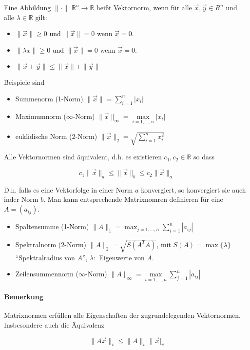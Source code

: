 \documentclass[a4paper,ngerman]{scrbook}
\newcommand{\R}{\ensuremath{\mathbb{R}}}%
\begin{document}
Eine Abbildung  $\| \cdot \|$ $\R^n \to \R$ heißt \underline{Vektornorm}, wenn für alle $\vec{x}, \vec{y} \in R^n$ und alle $\lambda \in \R$ gilt:
\begin{itemize}
\item $\|\vec{x}\| \geq 0$ und $\|\vec{x}\| = 0$ wenn $\vec{x} = 0$.
\item $\|\lambda x\| \geq 0$ und $\|\vec{x}\| = 0$ wenn $\vec{x} = 0$.
\item $\|\vec{x} + \vec{y}\| \leq \|\vec{x}\| + \|\vec{y}\|$
\end{itemize}

Beispiele sind

\begin{itemize}
\item Summenorm (1-Norm) $\|\vec{x}\| = \sum_{i=1}^n |x_i|$
  \item Maximumnorm ($\infty$-Norm) $\|\vec{x}\|_{\infty} = \max\limits_{i=1,\dots,n} |x_i|$
\item euklidische Norm (2-Norm) $\|\vec{x}\|_2 = \sqrt{\sum_{i=1}^n x_i^2}$
\end{itemize}

Alle Vektornormen sind äquivalent, d.h\@. es existieren $c_1,c_2 \in \R$ so dass

\[
c_1\|\vec{x}\|_a \leq \|\vec{x}\|_b \leq c_2 \|\vec{x}\|_a
\]

D.h\@. falls es eine Vektorfolge in einer Norm $a$ konvergiert, so konvergiert sie auch inder Norm $b$. Man kann entsprechende Matrixnomren definieren für eine $A = (a_{ij})$.
\begin{itemize}
\item Spaltensumme (1-Norm) $\|A\|_1 = \max_{j=1,\dots,n} \sum_{i=1}^n |a_{ij}|$
\item Spektralnorm (2-Norm) $\|A\|_2 = \sqrt{S(A^TA)}$, mit $S(A) = \max\{\lambda\}$ "`Spektralradius von $A$"', $\lambda\colon$ Eigenwerte von $A$.
\item Zeilensummennorm ($\infty$-Norm) $\|A\|_\infty = \max\limits_{i=1,\dots,n} \displaystyle\sum_{j=1}^n |a_{ij}|$
\end{itemize}

\paragraph{Bemerkung}

Matrixnormen erfüllen alle Eigenschaften der zugrundelegenden Vektornormen. Insbesondere auch die Äquivalenz

\[
\|A\vec{x}\|_v \leq \|A\|_v\|\vec{x}|_v
\]
\end{document}
